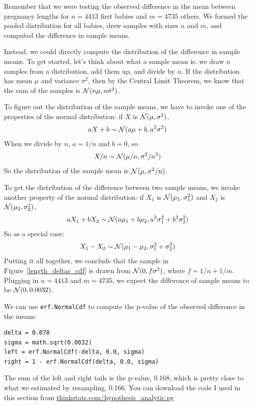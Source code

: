 \documentclass[12pt]{book}
\begin{document}
Remember that we were testing the observed difference in the mean between
pregnancy lengths for $n=4413$ first babies and $m=4735$ others.  We formed
the pooled distribution for all babies, drew samples with sizes $n$ and
$m$, and computed the difference in sample means.

Instead, we could directly compute the distribution of the difference
in sample means.  To get started, let's think about what a sample mean
is: we draw $n$ samples from a distribution, add them up, and
divide by $n$.  If the distribution has mean $\mu$ and variance
$\sigma^2$, then by the Central Limit Theorem, we know that the sum of
the samples is $\mathcal{N} (n \mu, n \sigma^2)$.

To figure out the distribution of the sample means, we have to invoke
one of the properties of the normal distribution: if $X$ is
$\mathcal{N} (\mu, \sigma^2)$,
%
\[ aX + b \sim \mathcal{N} (a \mu + b, a^2 \sigma^2) \]
%
When we divide by $n$, $a=1/n$ and $b=0$, so
%
\[ X/n \sim \mathcal{N} (\mu / n, \sigma^2/ n^2) \]
%
So the distribution of the sample mean is $\mathcal{N} (\mu, \sigma^2/n)$.

To get the distribution of the difference between two sample means,
we invoke another property of the normal distribution: if $X_1$ is
$\mathcal{N} (\mu_1, \sigma_1^2)$ and $X_2$ is
$\mathcal{N} (\mu_2, \sigma_2^2)$,
%
\[ aX_1 + bX_2 \sim \mathcal{N} (a\mu_1 + b\mu_2, 
                                 a^2\sigma_1^2 + b^2\sigma_2^2) \]
%
So as a special case:
%
\[ X_1 - X_2 \sim \mathcal{N} (\mu_1 - \mu_2, 
                               \sigma_1^2 + \sigma_2^2) \]
%
Putting it all together, we conclude that the sample in
Figure~\ref{length_deltas_cdf} is drawn from 
$\mathcal{N} (0, f \sigma^2)$, where $f = 1/n + 1/m$.  Plugging in
$n=4413$ and $m=4735$, we expect the difference of sample means to be
$\mathcal{N} (0, 0.0032)$.

We can use {\tt erf.NormalCdf} to compute the p-value of the observed 
difference in the means:

\begin{verbatim}
delta = 0.078
sigma = math.sqrt(0.0032)
left = erf.NormalCdf(-delta, 0.0, sigma)
right = 1 - erf.NormalCdf(delta, 0.0, sigma)
\end{verbatim}

The sum of the left and right tails is the p-value, 0.168, which is
pretty close to what we estimated by resampling, 0.166. 
You can download the code I used in this section from
\url{thinkstats.com/hypothesis_analytic.py}
\end{document}
